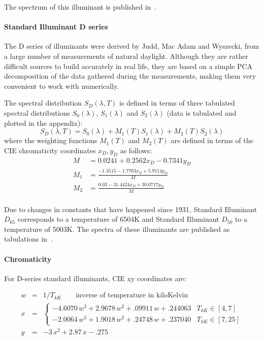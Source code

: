 The spectrum of this illuminant is published in~\cite{isocie:11664-2:2022}.

\paragraph{Standard Illuminant D series}

The D series of illuminants were derived by Judd, Mac Adam and Wyszecki, from a
large number of measurements of natural daylight. Although they are rather
difficult sources to build accurately in real life, they are based on a simple
PCA decomposition of the data gathered during the measurements, making them
very convenient to work with numerically.

The spectral distribution $S_D(\lambda, T)$ is defined in terms of three tabulated spectral
distributions $S_0(\lambda)$, $S_1(\lambda)$ and $S_2(\lambda)$ (data is tabulated
and plotted in the appendix):
\begin{equation}
S_D(\lambda, T) = S_0(\lambda) + M_1(T) S_1(\lambda) + M_2(T) S_2(\lambda)
\end{equation}
where the weighting functions $M_1(T)$ and $M_2(T)$ are defined in terms of the
\gls{CIE} chromaticity coordinates $x_D, y_D$ as follows:
\begin{align*}
M   &= 0.0241 + 0.2562 x_D - 0.7341 y_D \\
M_1 &= \frac{-1.3515 - 1.7703 x_D + 5.9114 y_D}{M} \\
M_2 &= \frac{0.03 - 31.4424 x_D + 30.0717 y_D}{M} \\
\end{align*}

Due to changes in constants that have happened since 1931, Standard Illuminant $D_{65}$
corresponds to a temperature of \num{6504}\unit{\kelvin} and Standard Illuminant $D_{50}$
to a temperature of \num{5003}\unit{\kelvin}.
The spectra of these illuminants are published as tabulations in~\cite{isocie:11664-2:2022}.

\paragraph{Chromaticity}
For D-series standard illuminants, \gls{CIE} xy coordinates are:

\begin{equation}
\begin{array}{rcl}
w & = & 1/T_{kK} \qquad \text{inverse of temperature in kiloKelvin}  \\
x & = & \begin{cases}
         - 4.6070\,w^3 + 2.9678 \,w^2 + .09911\,w + .244063  & T_{kK} \in [4, 7] \\
         - 2.0064\,w^3 + 1.9018\,w^2  +  .24748\,w + .237040 & T_{kK} \in [7, 25]
    \end{cases} \\
y & = & -3\,x^2  + 2.87\,x - .275
\end{array}
\end{equation}


